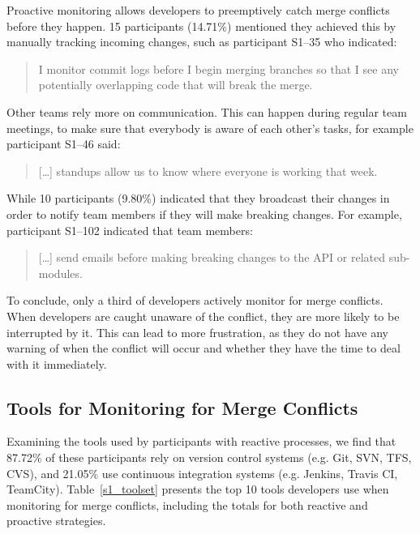 Proactive monitoring allows developers to preemptively catch merge conflicts before they happen.
15 participants (14.71\%) mentioned they achieved this by manually tracking incoming changes, such as participant S1--35 who indicated:
\begin{quotation}
	I monitor commit logs before I begin merging branches so that I see any potentially overlapping code that will break the merge.
\end{quotation}
Other teams rely more on communication.
This can happen during regular team meetings, to make sure that everybody is aware of each other's tasks, for example participant S1--46 said:
\begin{quotation}
	[\ldots] standups allow us to know where everyone is working that week.
\end{quotation}
While 10 participants (9.80\%) indicated that they broadcast their changes in order to notify team members if they will make breaking changes.
For example, participant S1--102 indicated that team members:
\begin{quotation}
	[\ldots] send emails before making breaking changes to the API or related sub-modules.
\end{quotation}

To conclude, only a third of developers actively monitor for merge conflicts.
When developers are caught unaware of the conflict, they are more likely to be interrupted by it.
This can lead to more frustration, as they do not have any warning of when the conflict will occur and whether they have the time to deal with it immediately.

\subsection{Tools for Monitoring for Merge Conflicts}

Examining the tools used by participants with reactive processes, we find that 87.72\% of these participants rely on version control systems (e.g. Git, SVN, TFS, CVS), and 21.05\% use continuous integration systems (e.g. Jenkins, Travis CI, TeamCity).
Table~\ref{s1_toolset} presents the top 10 tools developers use when monitoring for merge conflicts, including the totals for both reactive and proactive strategies.

